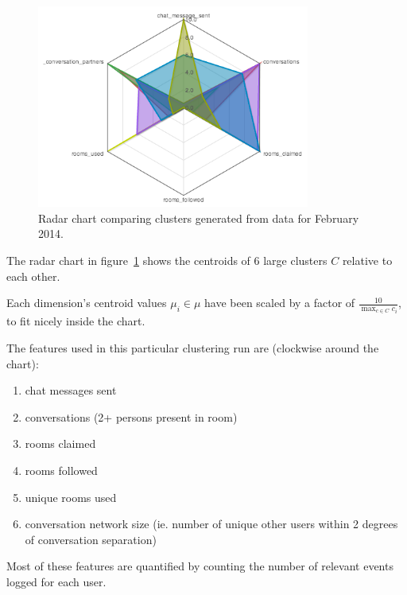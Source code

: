 \begin{figure}[h]
  \centering
    \includegraphics[width=0.8\textwidth]{Figures/clusterings/confluence-post/comp-02-feb}
    \caption{Radar chart comparing clusters generated from data for February 2014.}
    \label{fig:radar-clusters-february}
\end{figure}

The radar chart in figure~\ref{fig:radar-clusters-february} shows the centroids of 6 large clusters $C$ relative to each other.

Each dimension's centroid values $\mu_i \in \mu$ have been scaled by a factor of $\frac{10}{\max_{c \in C}{c_i}}$, to fit nicely inside the chart.

The features used in this particular clustering run are (clockwise around the chart):

\begin{enumerate}
  \item chat messages sent
  \item conversations (2+ persons present in room)
  \item rooms claimed
  \item rooms followed
  \item unique rooms used
  \item conversation network size (ie. number of unique other users within 2 degrees of conversation separation)
\end{enumerate}

Most of these features are quantified by counting the number of relevant events logged for each user.

%
%
%

